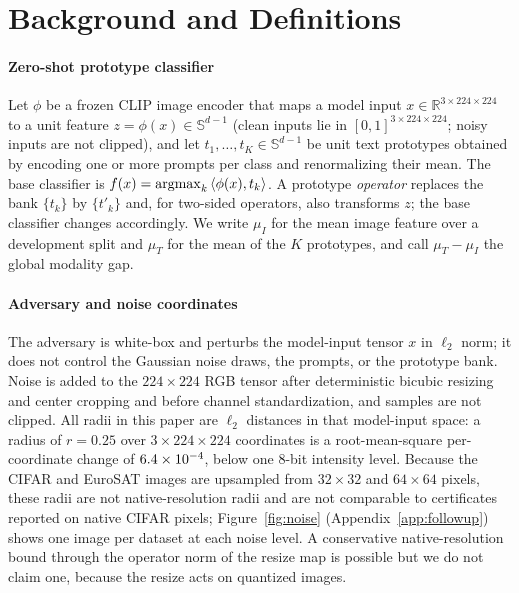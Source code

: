 \section{Background and Definitions}
\label{sec:background}

\paragraph{Zero-shot prototype classifier}
Let $\phi$ be a frozen CLIP image encoder that maps a model input
$x\in\mathbb R^{3\times224\times224}$ to a unit feature $z=\phi(x)\in\mathbb
S^{d-1}$ (clean inputs lie in $[0,1]^{3\times224\times224}$; noisy inputs are
not clipped),
and let $t_1,\dots,t_K\in\mathbb S^{d-1}$ be unit text prototypes obtained by
encoding one or more prompts per class and renormalizing their mean. The base
classifier is $f(x)=\operatorname{argmax}_k\,\langle\phi(x),t_k\rangle$. A prototype
\emph{operator} replaces the bank $\{t_k\}$ by $\{t'_k\}$ and, for two-sided
operators, also transforms $z$; the base classifier changes accordingly. We
write $\mu_I$ for the mean image feature over a development split and $\mu_T$
for the mean of the $K$ prototypes, and call $\mu_T-\mu_I$ the global modality
gap.

\paragraph{Adversary and noise coordinates}
The adversary is white-box and perturbs the model-input tensor $x$ in
$\ell_2$ norm; it does not control the Gaussian noise draws, the prompts, or
the prototype bank. Noise is added to the $224\times224$ RGB tensor after
deterministic bicubic resizing and center cropping and before channel
standardization, and samples are not clipped. All radii in this paper are
$\ell_2$ distances in that model-input space: a radius of $r=0.25$ over
$3\times224\times224$ coordinates is a root-mean-square per-coordinate change
of $6.4\times 10^{-4}$, below one 8-bit intensity level. Because the
CIFAR and EuroSAT images are upsampled from $32\times32$ and $64\times64$
pixels, these radii are not native-resolution radii and are not comparable to
certificates reported on native CIFAR pixels; Figure~\ref{fig:noise}
(Appendix~\ref{app:followup}) shows one image per dataset at each noise level.
A conservative native-resolution
bound through the operator norm of the resize map is possible but we do not
claim one, because the resize acts on quantized images.

